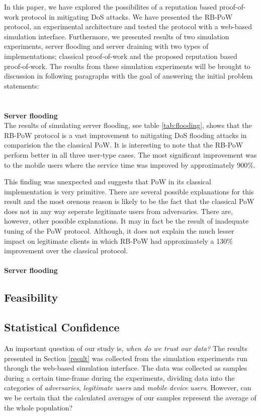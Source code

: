 In this paper, we have explored the possibilites of a reputation based proof-of-work protocol in mitigating DoS attacks. We have presented the RB-PoW protocol, an experimental architecture and tested the protocol with a web-based simulation interface. Furthermore, we presented results of two simulation experiments, server flooding and server draining with two types of implementations; classical proof-of-work and the proposed reputation based proof-of-work. The results from these simulation experiments will be brought to discussion in following paragraphs with the goal of answering the initial problem statements:
\\
\\
\\
\textbf{Server flooding}
\vspace{7pt}
\\
The results of simulating server flooding, see table \ref{tab:flooding}, shows that the RB-PoW protocol is a vast improvement to mitigating DoS flooding attacks in comparision the the classical PoW. It is interesting to note that the RB-PoW perform better in all three user-type cases. The most significant improvement was to the mobile users where the service time was improved by approximately 900\%. 

This finding was unexpected and suggests that PoW in its classical implementation is very primitive.
There are several possible explanations for this result and the most orenous reason is likely to be the fact that the classical PoW does not in any way seperate legitimate users from adversaries.
There are, however, other possible explanations. It may in fact be the result of inadequate tuning of the PoW protocol. Although, it does not explain the much lesser impact on legitimate clients in which RB-PoW had approximately a 130\% improvement over the classical protocol.
\\
\\
\textbf{Server flooding}
\vspace{7pt}
\\



\subsection{Feasibility}
\subsection{Statistical Confidence}
An important question of our study is, \emph{when do we trust our data?} The results presented in Section \ref{result} was collected from the simulation experiments run through the web-based simulation interface. The data was collected as samples during a certain time-frame during the experiments, dividing data into the categories of \emph{adversaries}, \emph{legitimate users} and \emph{mobile device users}. However,  can we be certain that the calculated averages of our samples represent the average of the whole population?

